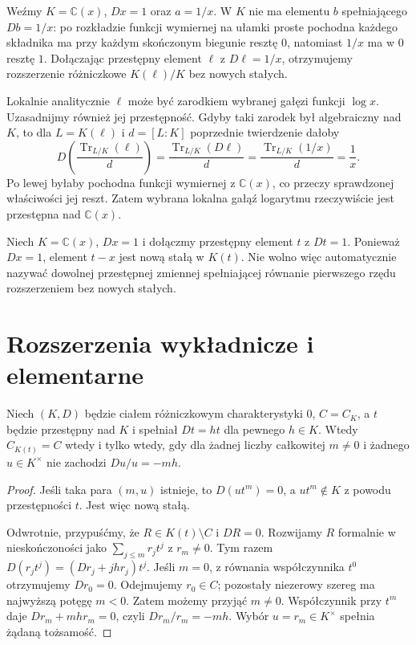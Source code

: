 \begin{przyklad}
\label{aa:prz:logarithmic-extension}
Weźmy $K=\mathbb C(x)$, $Dx=1$ oraz
$a=1/x$. W $K$ nie ma elementu $b$
spełniającego $Db=1/x$: po rozkładzie
funkcji wymiernej na ułamki proste
pochodna każdego składnika ma przy
każdym skończonym biegunie resztę $0$,
natomiast $1/x$ ma w $0$ resztę $1$.
Dołączając przestępny element $\ell$ z
$D\ell=1/x$, otrzymujemy rozszerzenie
różniczkowe $K(\ell)/K$ bez nowych stałych.

Lokalnie analitycznie $\ell$ może być
zarodkiem wybranej gałęzi funkcji $\log x$.
Uzasadnijmy również jej przestępność.
Gdyby taki zarodek był algebraiczny nad $K$,
to dla $L=K(\ell)$ i $d=[L:K]$ poprzednie
twierdzenie dałoby
\[
D\!\left(\frac{\operatorname{Tr}_{L/K}(\ell)}d\right)
=\frac{\operatorname{Tr}_{L/K}(D\ell)}d
=\frac{\operatorname{Tr}_{L/K}(1/x)}d
=\frac1x.
\]
Po lewej byłaby pochodna funkcji wymiernej
z $\mathbb C(x)$, co przeczy sprawdzonej
właściwości jej reszt. Zatem wybrana
lokalna gałąź logarytmu rzeczywiście jest
przestępna nad $\mathbb C(x)$.
\end{przyklad}

\begin{przyklad}
\label{aa:prz:new-constant-obstruction}
Niech $K=\mathbb C(x)$, $Dx=1$ i dołączmy
przestępny element $t$ z $Dt=1$.
Ponieważ $Dx=1$, element $t-x$
jest nową stałą w $K(t)$.
Nie wolno więc automatycznie nazywać
dowolnej przestępnej zmiennej spełniającej
równanie pierwszego rzędu rozszerzeniem
bez nowych stałych.
\end{przyklad}

\section{Rozszerzenia wykładnicze i elementarne}

\begin{lemat}
\label{aa:lem:exponential-extension-constants}
Niech $(K,D)$ będzie ciałem różniczkowym
charakterystyki $0$, $C=C_K$, a $t$ będzie
przestępny nad $K$ i spełniał $Dt=ht$
dla pewnego $h\in K$. Wtedy $C_{K(t)}=C$
wtedy i tylko wtedy, gdy dla żadnej liczby
całkowitej $m\ne0$ i żadnego $u\in K^\times$
nie zachodzi $Du/u=-mh$.
\end{lemat}
\begin{proof}
Jeśli taka para $(m,u)$ istnieje,
to $D(ut^m)=0$, a $ut^m\notin K$
z powodu przestępności $t$. Jest więc
nową stałą.

Odwrotnie, przypuśćmy, że
$R\in K(t)\setminus C$ i $DR=0$.
Rozwijamy $R$ formalnie w nieskończoności
jako $\sum_{j\le m}r_jt^j$ z $r_m\ne0$.
Tym razem
$D(r_jt^j)=(Dr_j+jhr_j)t^j$.
Jeśli $m=0$, z równania współczynnika
$t^0$ otrzymujemy $Dr_0=0$.
Odejmujemy $r_0\in C$; pozostały niezerowy
szereg ma najwyższą potęgę $m<0$.
Zatem możemy przyjąć $m\ne0$.
Współczynnik przy $t^m$ daje
$Dr_m+mhr_m=0$,
czyli $Dr_m/r_m=-mh$.
Wybór $u=r_m\in K^\times$ spełnia
żądaną tożsamość.
\end{proof}

